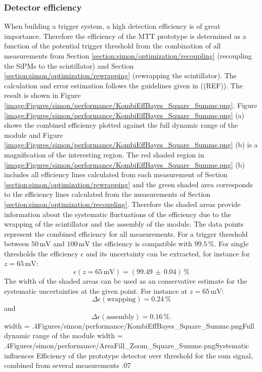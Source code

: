 \subsubsection{Detector efficiency}
When building a trigger system, a high detection efficiency is of great importance. Therefore the efficiency of the MTT prototype is determined as a function of the potential trigger threshold from the combination of all measurements from Section \ref{section:simon/optimization/recoupling} (recoupling the SiPMs to the scintillator) and Section \ref{section:simon/optimization/rewrapping} (rewrapping the scintillator). The calculation and error estimation follows the guidelines given in ((REF)). The result is shown in Figure \ref{image:Figures/simon/performance/KombiEffBayes_Square_Summe.png}. Figure \ref{image:Figures/simon/performance/KombiEffBayes_Square_Summe.png} (a) shows the combined efficiency plotted against the full dynamic range of the module and Figure \ref{image:Figures/simon/performance/KombiEffBayes_Square_Summe.png} (b) is a magnification of the interesting region. The red shaded region in \ref{image:Figures/simon/performance/KombiEffBayes_Square_Summe.png} (b) includes all efficiency lines calculated from each measurement of Section \ref{section:simon/optimization/rewrapping} and the green shaded area corresponds to the efficiency lines calculated from the measurements of Section \ref{section:simon/optimization/recoupling}. Therefore the shaded areas provide information about the systematic fluctuations of the efficiency due to the wrapping of the scintillator and the assembly of the module. The data points represent the combined efficiency for all measurements. For a trigger threshold between $50\,\text{mV}$ and $100\,\text{mV}$ the efficiency is compatible with $99.5\,\%$. For single thresholds the efficiency $\epsilon$ and its uncertainty can be extracted, for instance for $z = 65\,\text{mV}$:
\begin{equation}
 \epsilon(z = 65\,\text{mV}) = (99.49\,\pm\,0.04)\,\%
\end{equation}
The width of the shaded areas can be used as an conservative estimate for the systematic uncertainties at the given point. For instance at $z = 65\,\text{mV}$:
\begin{equation}
 \Delta\epsilon(\text{wrapping}) = 0.24\,\%
\end{equation}
and
\begin{equation}
 \Delta\epsilon(\text{assembly}) = 0.16\,\%.
\end{equation}
\doubleimage
{width = .4\textwidth}{Figures/simon/performance/KombiEffBayes_Square_Summe.png}{Full dynamic range of the module}
{width = .4\textwidth}{Figures/simon/performance/AreaFill_Zoom_Square_Summe.png}{Systematic influences}
{Efficiency of the prototype detector over threshold for the sum signal, combined from several measurements}
{.07\textwidth}